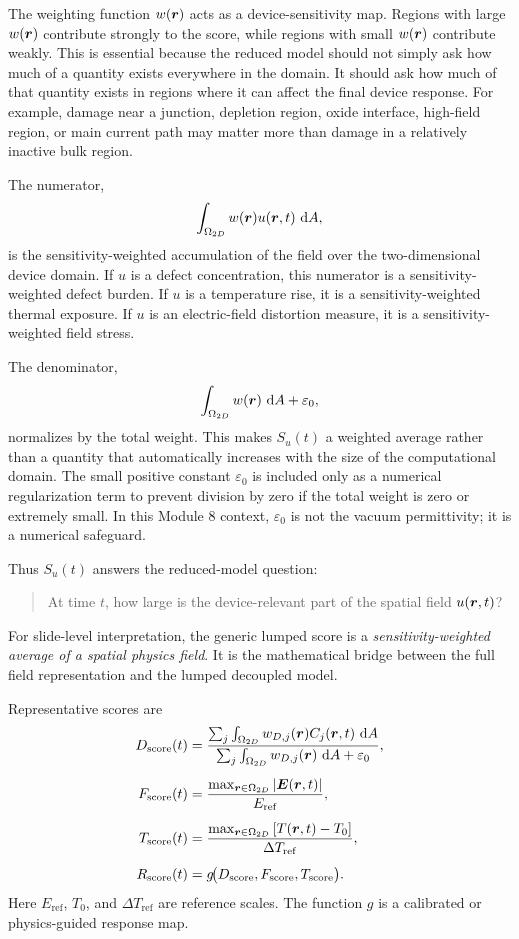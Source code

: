 \documentclass[11pt]{article}
\begin{document}
The weighting function \(w(\bm{r})\) acts as a device-sensitivity map. Regions with large \(w(\bm{r})\) contribute strongly to the score, while regions with small \(w(\bm{r})\) contribute weakly. This is essential because the reduced model should not simply ask how much of a quantity exists everywhere in the domain. It should ask how much of that quantity exists in regions where it can affect the final device response. For example, damage near a junction, depletion region, oxide interface, high-field region, or main current path may matter more than damage in a relatively inactive bulk region.

The numerator,
\[
    \int_{\Omega_{2D}} w(\bm{r})u(\bm{r},t)\,\mathop{}\!\mathrm{d} A,
\]
is the sensitivity-weighted accumulation of the field over the two-dimensional device domain. If \(u\) is a defect concentration, this numerator is a sensitivity-weighted defect burden. If \(u\) is a temperature rise, it is a sensitivity-weighted thermal exposure. If \(u\) is an electric-field distortion measure, it is a sensitivity-weighted field stress.

The denominator,
\[
    \int_{\Omega_{2D}} w(\bm{r})\,\mathop{}\!\mathrm{d} A+\varepsilon_0,
\]
normalizes by the total weight. This makes \(S_u(t)\) a weighted average rather than a quantity that automatically increases with the size of the computational domain. The small positive constant \(\varepsilon_0\) is included only as a numerical regularization term to prevent division by zero if the total weight is zero or extremely small. In this Module 8 context, \(\varepsilon_0\) is not the vacuum permittivity; it is a numerical safeguard.

Thus \(S_u(t)\) answers the reduced-model question:
\begin{quote}
At time \(t\), how large is the device-relevant part of the spatial field \(u(\bm{r},t)\)?
\end{quote}
For slide-level interpretation, the generic lumped score is a \emph{sensitivity-weighted average of a spatial physics field}. It is the mathematical bridge between the full field representation and the lumped decoupled model.

Representative scores are
\begin{align}
    D_{\mathrm{score}}(t)
    &=
    \frac{\sum_j \int_{\Omega_{2D}} w_{D,j}(\bm{r}) C_j(\bm{r},t)\,\mathop{}\!\mathrm{d} A}
    {\sum_j \int_{\Omega_{2D}} w_{D,j}(\bm{r})\,\mathop{}\!\mathrm{d} A+\varepsilon_0},
    \label{eq:damage_score}\\[0.5em]
    F_{\mathrm{score}}(t)
    &=
    \frac{\max_{\bm{r}\in\Omega_{2D}} \abs{\bm{E}(\bm{r},t)}}
    {E_{\mathrm{ref}}},
    \label{eq:field_score}\\[0.5em]
    T_{\mathrm{score}}(t)
    &=
    \frac{\max_{\bm{r}\in\Omega_{2D}} \left[T(\bm{r},t)-T_0\right]}
    {\Delta T_{\mathrm{ref}}},
    \label{eq:thermal_score}\\[0.5em]
    R_{\mathrm{score}}(t)
    &=
    g\!\big(D_{\mathrm{score}},F_{\mathrm{score}},T_{\mathrm{score}}\big).
    \label{eq:response_score}
\end{align}
Here \(E_{\mathrm{ref}}\), \(T_0\), and \(\Delta T_{\mathrm{ref}}\) are reference scales. The function \(g\) is a calibrated or physics-guided response map.
\end{document}
